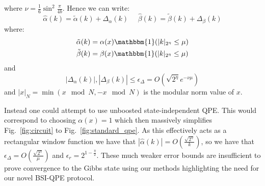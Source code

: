 \documentclass[aps,floatfix,10pt,amssymb,amsfont,amsmath,superscriptaddress,float,nofootinbib,longbibliography,nobalancelastpage,twocolumn]{revtex4-2}
\begin{document}
where $\nu = \frac{1}{6}\sin^2\frac{\pi}{4b}$. Hence we can write:
\begin{equation}
    \hat\alpha(k) = \tilde\alpha(k) + \Delta_{\alpha}(k) \>\>\>\>\>\>\hat\beta(k) = \tilde\beta(k) + \Delta_{\beta}(k)
    \label{eq:decomposealpha}
\end{equation}
where:
\begin{align}
    \tilde\alpha(k) &= \alpha(x)\mathbbm{1}(|k|_{2^{\eta}}\leq \mu)\\
    \tilde\beta(k) &= \beta(x)\mathbbm{1}(|k|_{2^{\eta}}\leq \mu)
    \label{eq:decomposealpha2}
\end{align}  and 
\begin{equation}
    |\Delta_\alpha(k)|,|\Delta_\beta(k)|\leq \epsilon_{\Delta} = O\left(\sqrt{2^{\eta}}e^{-\nu \mu}\right)
    \label{eq:decomposealpha3}
\end{equation} and $|x|_N = \min(x \mod N,- x\mod N)$ is the modular norm value of $x$. 


Instead one could attempt to use unboosted state-independent QPE. This would correspond to choosing $\alpha(x)=1$ which then massively simplifies Fig.~\ref{fig:circuit} to Fig.~\ref{fig:standard_qpe}. As this effectively acts as a rectangular window function we have that $|\hat\alpha(k)| = O(\frac{\sqrt{2^{\eta}}}{k})$, so we have that $\epsilon_{\Delta} = O(\frac{\sqrt{2^{\eta}}}{\mu})$ and $\epsilon_r = 2^{1-\frac{\eta}{2}}$. These much weaker error bounds are insufficient to prove convergence to the Gibbs state using our methods highlighting the need for our novel BSI-QPE protocol.



\end{document}
